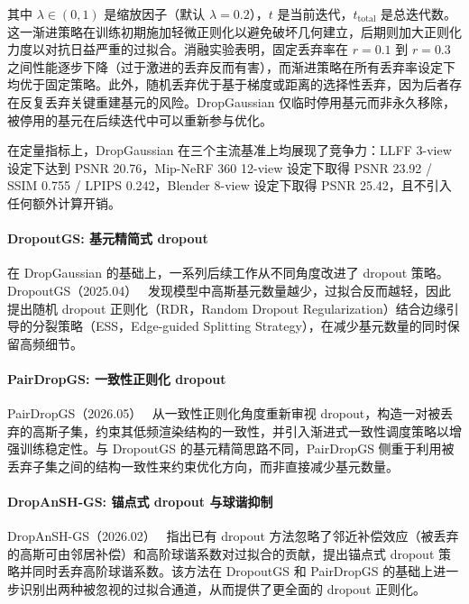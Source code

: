 其中 $\lambda \in (0,1)$ 是缩放因子（默认 $\lambda = 0.2$），$t$ 是当前迭代，$t_{\text{total}}$ 是总迭代数。这一渐进策略在训练初期施加轻微正则化以避免破坏几何建立，后期则加大正则化力度以对抗日益严重的过拟合。消融实验表明，固定丢弃率在 $r = 0.1$ 到 $r = 0.3$ 之间性能逐步下降（过于激进的丢弃反而有害），而渐进策略在所有丢弃率设定下均优于固定策略。此外，随机丢弃优于基于梯度或距离的选择性丢弃，因为后者存在反复丢弃关键重建基元的风险。DropGaussian 仅临时停用基元而非永久移除，被停用的基元在后续迭代中可以重新参与优化。

在定量指标上，DropGaussian 在三个主流基准上均展现了竞争力：LLFF 3-view 设定下达到 PSNR 20.76，Mip-NeRF 360 12-view 设定下取得 PSNR 23.92 / SSIM 0.755 / LPIPS 0.242，Blender 8-view 设定下取得 PSNR 25.42，且不引入任何额外计算开销。

\paragraph{DropoutGS: 基元精简式 dropout}

在 DropGaussian 的基础上，一系列后续工作从不同角度改进了 dropout 策略。DropoutGS（2025.04）~\cite{2504_09491} 发现模型中高斯基元数量越少，过拟合反而越轻，因此提出随机 dropout 正则化（RDR，Random Dropout Regularization）结合边缘引导的分裂策略（ESS，Edge-guided Splitting Strategy），在减少基元数量的同时保留高频细节。

\paragraph{PairDropGS: 一致性正则化 dropout}

PairDropGS（2026.05）~\cite{2605_12399} 从一致性正则化角度重新审视 dropout，构造一对被丢弃的高斯子集，约束其低频渲染结构的一致性，并引入渐进式一致性调度策略以增强训练稳定性。与 DropoutGS 的基元精简思路不同，PairDropGS 侧重于利用被丢弃子集之间的结构一致性来约束优化方向，而非直接减少基元数量。

\paragraph{DropAnSH-GS: 锚点式 dropout 与球谐抑制}

DropAnSH-GS（2026.02）~\cite{2602_20933} 指出已有 dropout 方法忽略了邻近补偿效应（被丢弃的高斯可由邻居补偿）和高阶球谐系数对过拟合的贡献，提出锚点式 dropout 策略并同时丢弃高阶球谐系数。该方法在 DropoutGS 和 PairDropGS 的基础上进一步识别出两种被忽视的过拟合通道，从而提供了更全面的 dropout 正则化。

